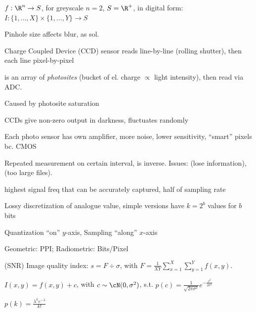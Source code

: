 \shortdefinition[Image] $f : \R^n \rightarrow S$,
for greyscale $n = 2$, $S = \R^+$,
in digital form: $I : \{ 1, \ldots, X \} \times \{ 1, \ldots, Y \} \rightarrow S$

\shortremark Pinhole size affects blur,  as sol.

\shortremark Charge Coupled Device (CCD) sensor reads line-by-line (rolling shutter), then each line pixel-by-pixel

 is an array of \textit{photosites} (bucket of el. charge $\propto$ light intensity), then read via ADC.

\shortremark[Blooming] Caused by photosite saturation

 CCDs give non-zero output in darkness, fluctuates randomly

 Each photo sensor has own amplifier, {\color{red} more noise, lower sensitivity}, {\color{ForestGreen} ``smart'' pixels bc. CMOS}

\shortdefinition[Sampling] Repeated measurement on certain interval,  is inverse.
Issues:  (lose information),  (too large files).

 highest signal freq that can be accurately captured, half of sampling rate

\shortdefinition[Quantization] Lossy discretization of analogue value, simple versions have $k = 2^b$ values for $b$ bits

\shortremark Quantization ``on'' $y$-axis, Sampling ``along'' $x$-axis

\shortdefinition[Res.] Geometric: PPI; Radiometric: Bits/Pixel

 (SNR) Image quality index: $s = F \div \sigma$, with $F = \frac{1}{XY}\sum_{x = 1}^{X} \sum_{y = 1}^{Y} f(x, y)$.

 $I(x, y) = f(x, y) + c$, with $c \sim \cN(0, \sigma^2)$, s.t. $p(c) = \frac{1}{\sqrt{2\pi \sigma^2}}e^{-\frac{c^2}{2 \sigma^2}}$

 $p(k) = \frac{\lambda^k e^{-\lambda}}{k!}$
